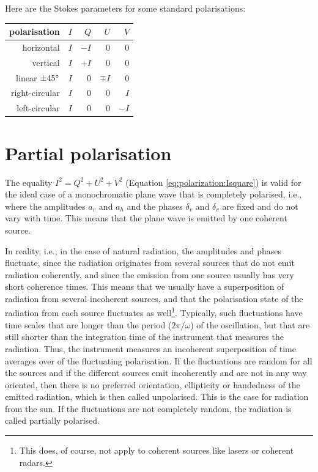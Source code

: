Here are the Stokes parameters for some standard polarisations:
\begin{center}
\label{stokes-examples}
\begin{tabular}{r@{\hspace{2em}(}r@{,}r@{,}r@{,}r@{)}}
\hline
polarisation & $I$ &   $Q$   &   $U$  &   $V$ \\ \hline
horizontal   & $I$ &  $-I$   &    0   &   0   \\ 
vertical     & $I$ &  $+I$   &    0   &   0   \\ 
linear $\pm 45^\circ$
             & $I$ &   0     &$\mp I$ &   0   \\ 
right-circular& $I$ &  0     &    0   &   $I$ \\ 
left-circular& $I$ &   0     &    0   &  $-I$ \\ \hline
\end{tabular}
\end{center}



\section{Partial polarisation}
\label{sec:polarization:part_pol}
The equality   $I^2 = Q^2 + U^2 + V^2$
(Equation \ref{eq:polarization:Isquare}) 
is valid for the ideal case of a 
monochromatic plane wave that is completely polarised, i.e., where the
amplitudes $a_v$ and
$a_h$ and the phases $\delta_v$ and $\delta_v$ are fixed and do not
vary with time. This means that the plane wave is emitted by one
coherent source.

In reality, i.e., in the case of natural radiation, 
the amplitudes and phases fluctuate, since the radiation
originates from several sources that do not emit radiation coherently,
and since the emission from one source usually has very short
coherence times. This
means that we usually have a superposition of radiation from several incoherent
sources, and that the polarisation state of the radiation from each
source fluctuates as well\footnote{This does, of course, not apply to
  coherent sources like lasers or coherent radars.}. 
Typically, such fluctuations have time scales that are longer than the
period ($2\pi/\omega$) of the oscillation, but that are still shorter
than the integration time of the instrument that measures the
radiation. Thus, the instrument measures an incoherent
 superposition of time averages
over of the fluctuating polarisation. If the fluctuations are
random for all the sources and if the different sources emit 
incoherently and are not in any way oriented, then there is no preferred
orientation, ellipticity or handedness of the emitted radiation, which
is then called unpolarised. This is the case for radiation from the sun.
If the fluctuations are not completely random, the
radiation is called partially polarised.

